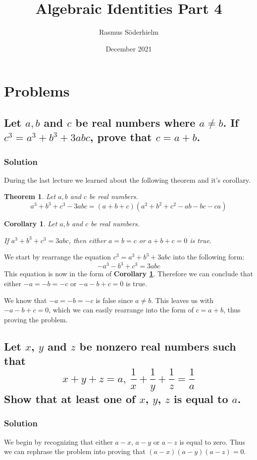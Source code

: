 \documentclass{article}
\title{Algebraic Identities Part 4}
\author{Rasmus Söderhielm}
\date{December 2021}
\newcommand{\solution}{\subsubsection*{\textcolor{MainColor}{Solution}}}
\newcounter{theoremcounter}
\theoremstyle{maintheorem}
\newtheorem{theorem}[theoremcounter]{\textcolor{SubColor}{Theorem}}
\newtheorem{corollary}{\textcolor{SubColor}{Corollary}}
\newcommand{\corref}[1]{\textcolor{SubSubColor}{\textbf{Corollary \ref{#1}}}}
\begin{document}
\linespread{1.5}\selectfont

\maketitle

\section*{\color{MainColor}Problems} \label{section}

\subsection{
    \normalfont
    Let $a, b$ and $c$ be real numbers where $a \neq b$. If $c^3 = a^3 + b^3 + 3abc$, prove that $c=a+b$.
}

\solution

During the last lecture we learned about the following theorem and it's corollary.
\begin{theorem}\label{thm1}
    Let $a, b$ and $c$ be real numbers.
    \[ a^3 + b^3 + c^3 - 3abc = (a + b + c)(a^2 + b^2 + c^2 - ab - bc - ca) \]
\end{theorem}
\begin{corollary}\label{cor1}
    Let $a, b$ and $c$ be real numbers.

    If $a^3 + b^3 + c^3 = 3abc$, then either $a = b = c$ or $a + b + c = 0$ is true.
\end{corollary}

We start by rearrange the equation $ c^3 = a^3 + b^3 + 3abc $ into the following form:
\[ -a^3 - b^3 + c^3 = 3abc \]
This equation is now in the form of \corref{cor1}. Therefore we can conclude that either $-a = -b = -c$ or $-a - b + c = 0$ is true.

We know that $ -a = -b = -c $ is false since $a \neq b$. This leaves us with $-a - b + c = 0$, which we can easily rearrange into the form of $c = a + b$, thus proving the problem.

\subsection{
    \normalfont
    Let $x$, $y$ and $z$ be nonzero real numbers such that
    \[x + y + z = a,\ \frac{1}{x} + \frac{1}{y} + \frac{1}{z} = \frac{1}{a}\]
    Show that at least one of $x$, $y$, $z$ is equal to $a$.
}

\solution

We begin by recognizing that either $a - x$, $a - y$ or $a - z$ is equal to zero. Thus we can rephrase the problem into proving that $ (a - x)(a - y)(a - z) = 0 $.
\end{document}
